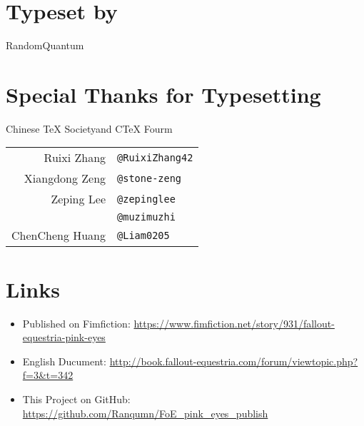 {\section*{Typeset by}

\begin{center}
    RandomQuantum
\end{center}

\section*{Special Thanks for Typesetting}

\begin{table}[H]
    \centering
    
    \begin{center}
    Chinese \TeX{} Society\footnotemark and C\TeX{} Fourm\footnotemark
    \end{center}
  
    \begin{tabular}{rl}
        Ruixi Zhang & \texttt{@RuixiZhang42} \\
        Xiangdong Zeng & \texttt{@stone-zeng} \\
        Zeping Lee & \texttt{@zepinglee} \\
        & \texttt{@muzimuzhi} \\
        ChenCheng Huang & \texttt{@Liam0205} \\
    \end{tabular}
\end{table}

\addtocounter{footnote}{-2} %



\section*{Links}

\begin{itemize}
    \item Published on Fimfiction: \url{https://www.fimfiction.net/story/931/fallout-equestria-pink-eyes}
    \item English Ducument: \url{http://book.fallout-equestria.com/forum/viewtopic.php?f=3\&t=342}
    \item This Project on GitHub: \url{https://github.com/Ranqumn/FoE_pink_eyes_publish}
\end{itemize}

}

